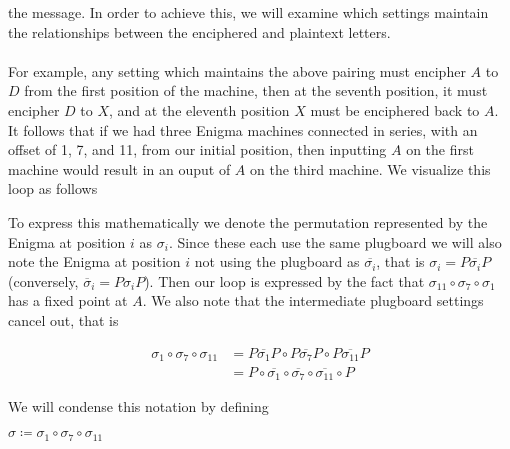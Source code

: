 the message.  In order to achieve this,
we will examine which settings maintain the relationships between the
enciphered and plaintext letters.
\\\\For example, any setting which maintains the above pairing must
encipher $A$ to $D$ from the first position of the machine, then at
the seventh position, it must encipher $D$ to $X$, and at the
eleventh position $X$ must be enciphered back to $A$. It follows that if we had
three Enigma machines connected in series, with an offset of 1, 7,
and 11, from our initial position, then inputting $A$ on the first
machine would result in an ouput of $A$ on the
third machine. We visualize this loop as follows
\begin{center}
\end{center}
To express this mathematically we denote the permutation represented
by the Enigma at
position $i$ as $\sigma_i$. Since these each use the same plugboard
we will also note the
Enigma at position $i$ not using the plugboard as
$\overline{\sigma_i}$, that is $\sigma_i = P\overline{\sigma_i}P$
(conversely, $\overline\sigma_i = P\sigma_iP$).
Then our loop is expressed by the fact that
$\sigma_{11}\circ\sigma_7\circ\sigma_1$ has a fixed point at $A$.
We also note that the intermediate plugboard settings cancel out, that is
\begin{center}
  \begin{align*}
    \sigma_{1}\circ\sigma_7\circ\sigma_{11} & =
    P\overline{\sigma_{1}}P\circ P\overline{\sigma_7}P\circ
    P\overline{\sigma_{11}}P
    \\&= P\circ
    \overline{\sigma_{1}}\circ\overline{\sigma_7}\circ\overline{\sigma_{11}}\circ
    P
  \end{align*}
\end{center}
We will condense this notation by defining
\begin{center}
  $\sigma \coloneq \sigma_{1}\circ\sigma_7\circ\sigma_{11}$
\end{center}
